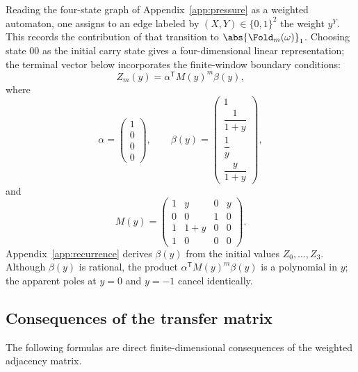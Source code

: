 Reading the four-state graph of Appendix~\ref{app:pressure} as a weighted automaton, one assigns to an edge labeled by \((X,Y)\in\{0,1\}^2\) the weight \(y^Y\). This records the contribution of that transition to \(\abs{\Fold_m(\omega)}_1\). Choosing state \(00\) as the initial carry state gives a four-dimensional linear representation; the terminal vector below incorporates the finite-window boundary conditions:
\begin{equation}\label{eq:boundary-vector}
Z_m(y)=\alpha^{\mathsf T} M(y)^m \beta(y),
\end{equation}
where
\begin{equation}\label{eq:boundary-data}
\alpha=
\begin{pmatrix}
1\\ 0\\ 0\\ 0
\end{pmatrix},
\qquad
\beta(y)=
\begin{pmatrix}
1\\[1mm]
\dfrac{1}{1+y}\\[2mm]
\dfrac{1}{y}\\[2mm]
\dfrac{y}{1+y}
\end{pmatrix},
\end{equation}
and
\begin{equation}\label{eq:My}
M(y)=
\begin{pmatrix}
1&y&0&y\\
0&0&1&0\\
1&1+y&0&0\\
1&0&0&0
\end{pmatrix}.
\end{equation}
Appendix~\ref{app:recurrence} derives \(\beta(y)\) from the initial values \(Z_0,\dots,Z_3\). Although \(\beta(y)\) is rational, the product \(\alpha^{\mathsf T}M(y)^m\beta(y)\) is a polynomial in \(y\); the apparent poles at \(y=0\) and \(y=-1\) cancel identically.

\subsection{Consequences of the transfer matrix}

The following formulas are direct finite-dimensional consequences of the weighted adjacency matrix.

